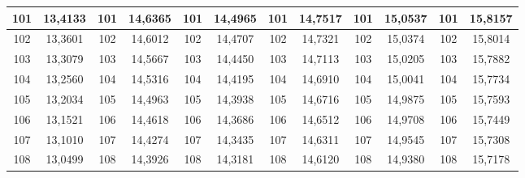 \documentclass[a4paper,12pt]{article} %
\begin{document}
\begin{longtable}[c]{cccccccccc|c|c|}
	\multicolumn{1}{|c|}{101} & \multicolumn{1}{c|}{13,4133} & \multicolumn{1}{c|}{101} & \multicolumn{1}{c|}{14,6365} & \multicolumn{1}{c|}{101} & \multicolumn{1}{c|}{14,4965} & \multicolumn{1}{c|}{101} & \multicolumn{1}{c|}{14,7517} & \multicolumn{1}{c|}{101} & 15,0537 & 101 & 15,8157 \\ \hline
	\multicolumn{1}{|c|}{102} & \multicolumn{1}{c|}{13,3601} & \multicolumn{1}{c|}{102} & \multicolumn{1}{c|}{14,6012} & \multicolumn{1}{c|}{102} & \multicolumn{1}{c|}{14,4707} & \multicolumn{1}{c|}{102} & \multicolumn{1}{c|}{14,7321} & \multicolumn{1}{c|}{102} & 15,0374 & 102 & 15,8014 \\ \hline
	\multicolumn{1}{|c|}{103} & \multicolumn{1}{c|}{13,3079} & \multicolumn{1}{c|}{103} & \multicolumn{1}{c|}{14,5667} & \multicolumn{1}{c|}{103} & \multicolumn{1}{c|}{14,4450} & \multicolumn{1}{c|}{103} & \multicolumn{1}{c|}{14,7113} & \multicolumn{1}{c|}{103} & 15,0205 & 103 & 15,7882 \\ \hline
	\multicolumn{1}{|c|}{104} & \multicolumn{1}{c|}{13,2560} & \multicolumn{1}{c|}{104} & \multicolumn{1}{c|}{14,5316} & \multicolumn{1}{c|}{104} & \multicolumn{1}{c|}{14,4195} & \multicolumn{1}{c|}{104} & \multicolumn{1}{c|}{14,6910} & \multicolumn{1}{c|}{104} & 15,0041 & 104 & 15,7734 \\ \hline
	\multicolumn{1}{|c|}{105} & \multicolumn{1}{c|}{13,2034} & \multicolumn{1}{c|}{105} & \multicolumn{1}{c|}{14,4963} & \multicolumn{1}{c|}{105} & \multicolumn{1}{c|}{14,3938} & \multicolumn{1}{c|}{105} & \multicolumn{1}{c|}{14,6716} & \multicolumn{1}{c|}{105} & 14,9875 & 105 & 15,7593 \\ \hline
	\multicolumn{1}{|c|}{106} & \multicolumn{1}{c|}{13,1521} & \multicolumn{1}{c|}{106} & \multicolumn{1}{c|}{14,4618} & \multicolumn{1}{c|}{106} & \multicolumn{1}{c|}{14,3686} & \multicolumn{1}{c|}{106} & \multicolumn{1}{c|}{14,6512} & \multicolumn{1}{c|}{106} & 14,9708 & 106 & 15,7449 \\ \hline
	\multicolumn{1}{|c|}{107} & \multicolumn{1}{c|}{13,1010} & \multicolumn{1}{c|}{107} & \multicolumn{1}{c|}{14,4274} & \multicolumn{1}{c|}{107} & \multicolumn{1}{c|}{14,3435} & \multicolumn{1}{c|}{107} & \multicolumn{1}{c|}{14,6311} & \multicolumn{1}{c|}{107} & 14,9545 & 107 & 15,7308 \\ \hline
	\multicolumn{1}{|c|}{108} & \multicolumn{1}{c|}{13,0499} & \multicolumn{1}{c|}{108} & \multicolumn{1}{c|}{14,3926} & \multicolumn{1}{c|}{108} & \multicolumn{1}{c|}{14,3181} & \multicolumn{1}{c|}{108} & \multicolumn{1}{c|}{14,6120} & \multicolumn{1}{c|}{108} & 14,9380 & 108 & 15,7178 \\ \hline

\end{longtable}
\end{document}
